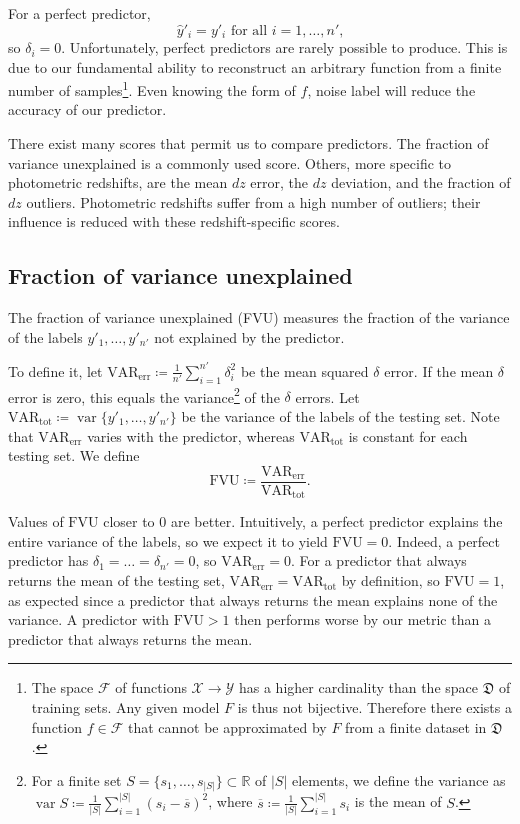 \documentclass[11pt,twoside,openright]{report}
\newcommand\bbR{\mathbb{R}}
\newcommand\cF{\mathcal{F}}
\newcommand\cX{\mathcal{X}}
\newcommand\cY{\mathcal{Y}}
\newcommand\fD{\mathfrak{D}}
\newcommand\abs[1]{\left|#1\right|}
\DeclareMathOperator{\var}{var}
\begin{document}
For a perfect predictor,\[
  \hat y'_i = y'_i \text{ for all }i=1, \dots, n'\text{,}
\] so $\delta_i = 0$. Unfortunately, perfect predictors are rarely possible to produce. This is due to our fundamental ability to reconstruct an arbitrary function from a finite number of samples\footnote{The space $\cF$ of functions $\cX \to \cY$ has a higher cardinality than the space $\fD$ of training sets. Any given model $F$ is thus not bijective. Therefore there exists a function $f \in \cF$ that cannot be approximated by $F$ from a finite dataset in $\fD$.}. Even knowing the form of $f$, noise label will reduce the accuracy of our predictor.

There exist many scores that permit us to compare predictors. The fraction of variance unexplained is a commonly used score. Others, more specific to photometric redshifts, are the mean $dz$ error, the $dz$ deviation, and the fraction of $dz$ outliers. Photometric redshifts suffer from a high number of outliers; their influence is reduced with these redshift-specific scores.

\subsection{Fraction of variance unexplained}
The fraction of variance unexplained (FVU) measures the fraction of the variance of the labels $y'_1, \dots, y'_{n'}$ not explained by the predictor.

To define it, let $\mathrm{VAR_{err}} \coloneqq \frac{1}{n'}\sum_{i=1}^{n'}\delta_i^2$ be the mean squared $\delta$ error. If the mean $\delta$ error is zero, this equals the variance\footnote{For a finite set $S = \{s_1, \dots, s_{\abs{S}}\} \subset \bbR$ of $\abs{S}$ elements, we define the variance as $\var S \coloneqq \frac1{\abs{S}}\sum_{i=1}^{\abs{S}}(s_i - \overline{s})^2$, where $\overline{s} \coloneqq \frac1{\abs{S}}\sum_{i=1}^{\abs{S}}s_i$ is the mean of $S$.} of the $\delta$ errors. Let $\mathrm{VAR_{tot}} \coloneqq \var\{y'_1, \dots, y'_{n'}\}$ be the variance of the labels of the testing set. Note that $\mathrm{VAR_{err}}$ varies with the predictor, whereas $\mathrm{VAR_{tot}}$ is constant for each testing set. We define \[
  \mathrm{FVU} \coloneqq \frac{\mathrm{VAR_{err}}}{\mathrm{VAR_{tot}}} \text{.}
\]

Values of $\mathrm{FVU}$ closer to $0$ are better. Intuitively, a perfect predictor explains the entire variance of the labels, so we expect it to yield $\mathrm{FVU} = 0$. Indeed, a perfect predictor has $\delta_1 = \dots = \delta_{n'} = 0$, so $\mathrm{VAR_{err}} = 0$. For a predictor that always returns the mean of the testing set, $\mathrm{VAR_{err}} = \mathrm{VAR_{tot}}$ by definition, so $\mathrm{FVU} = 1$, as expected since a predictor that always returns the mean explains none of the variance. A predictor with $\mathrm{FVU} > 1$ then performs worse by our metric than a predictor that always returns the mean.
\end{document}
